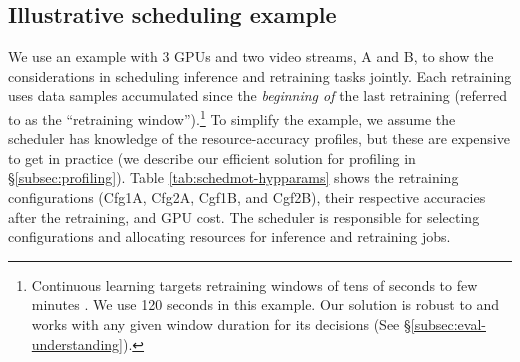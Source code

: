 

\subsection{Illustrative scheduling example}
\label{subsec:motivation-sched-example}


We use an example with $3$ GPUs and two video streams, A and B, to show the considerations in scheduling inference and retraining tasks jointly.
Each retraining uses data samples accumulated since the {\em beginning of} the last retraining (referred to as the ``retraining window'').\footnote{Continuous learning targets retraining windows of tens of seconds to few minutes \cite{distribution-20, mullapudi2019}. We use 120 seconds in this example. Our solution is robust to and works with any given window duration for its decisions (See \S{\ref{subsec:eval-understanding}}).} %
To simplify the example, we assume the scheduler has knowledge of the resource-accuracy profiles, but these are expensive to get in practice (we describe our efficient solution for profiling in \S\ref{subsec:profiling}).
Table \ref{tab:schedmot-hypparams} shows the retraining configurations ({\small Cfg1A, Cfg2A, Cgf1B, and Cgf2B}), their respective accuracies after the retraining, and GPU cost.
The scheduler is responsible for selecting configurations and allocating resources for inference and retraining jobs.






